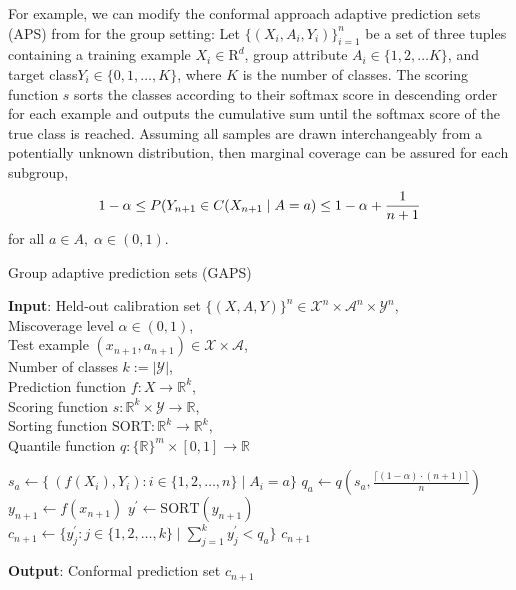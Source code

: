 \documentclass[letterpaper]{article} %
\begin{document}
For example, we can modify the conformal approach adaptive prediction sets (APS) from \citet{NEURIPS2020_244edd7e} for the group setting:
Let $\{(X_i, A_i, Y_i)\}_{i=1}^n$ be a set of three tuples containing a training example $X_i \in \mathrm{R}^d$, group attribute $A_i \in \{1, 2, \ldots K\}$, and target class$Y_i \in \{0, 1, \ldots, K\}$, where $K$ is the number of classes.
The scoring function $s$ sorts the classes according to their softmax score in descending order for each example and outputs the cumulative sum until the softmax score of the true class is reached.
Assuming all samples are drawn interchangeably from a potentially unknown distribution, then marginal coverage can be assured for each subgroup,
\begin{equation}
\small
1 - \alpha \leq P(Y_{n+1} \in C(X_{n+1} \mid A = a) \leq 1 - \alpha + \frac{1}{n + 1}
\end{equation}
for all $a \in A, \; \alpha \in (0, 1)$.


\begin{algorithm}[tb]
\small
\caption{Group adaptive prediction sets (GAPS)}
\label{alg:gaps}
\textbf{Input}:
Held-out calibration set $\{(X, A, Y)\}^n \in \mathcal{X}^n \times \mathcal{A}^n \times \mathcal{Y}^n$, \\
Miscoverage level $\alpha \in (0, 1)$, \\
Test example $\left(x_{n+1}, a_{n+1}\right) \in \mathcal{X} \times \mathcal{A}$, \\
Number of classes $k := \lvert\mathcal{Y}\rvert$, \\
Prediction function $f: X \rightarrow \mathbb{R}^k$, \\
Scoring function $s: \mathbb{R}^k \times \mathcal{Y} \rightarrow \mathbb{R} $, \\
Sorting function $\mathrm{SORT}: \mathbb{R}^k \rightarrow \mathbb{R}^k$, \\
Quantile function $q: \{\mathbb{R}\}^m \times [0, 1] \rightarrow \mathbb{R}$\\
\begin{algorithmic}[1] %
\STATE $s_a \leftarrow \{\ \left(f(X_i), Y_i\right) : i \in \{1, 2, \ldots, n\} \mid A_i = a\}$
\STATE $q_a \leftarrow q(s_a, \frac{\lceil (1 - \alpha) \cdot (n + 1) \rceil}{n})$
\ENDFOR
{}
\STATE $y_{n+1} \leftarrow f(x_{n+1})$
\STATE $y^\prime \leftarrow \mathrm{SORT}(y_{n+1})$
\STATE $c_{n+1} \leftarrow \{y^\prime_j : j \in \{1, 2, \ldots, k\} \mid \sum_{j=1}^k y^\prime_j < q_a \}$
\ENDIF
\ENDFOR
\RETURN $c_{n+1}$
\end{algorithmic}
\textbf{Output}: Conformal prediction set $c_{n+1}$ \\
\end{algorithm}
\end{document}
